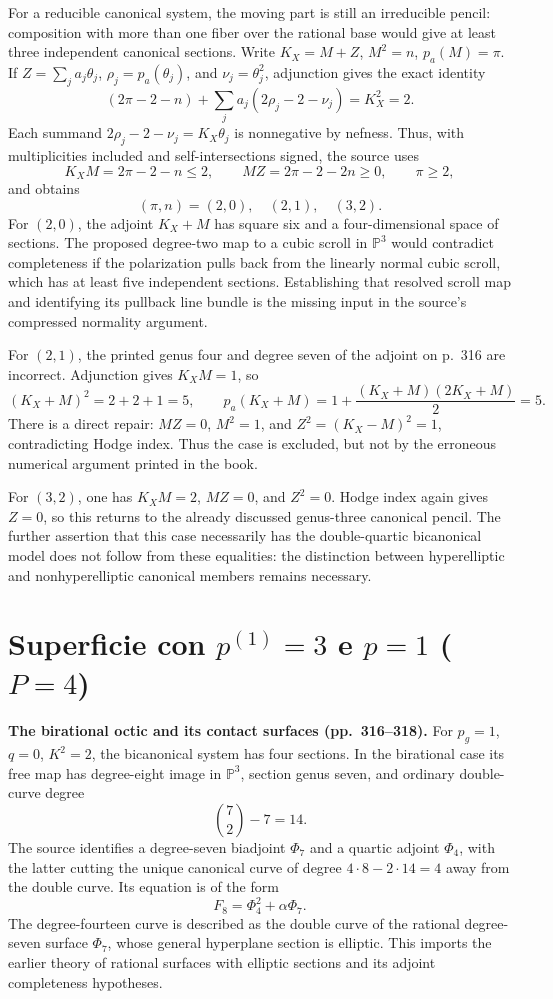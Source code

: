 For a reducible canonical system, the moving part is still an irreducible pencil: composition with more than one fiber over the rational base would give at least three independent canonical sections. Write \(K_X=M+Z\), \(M^2=n\), \(p_a(M)=\pi\). If \(Z=\sum_j a_j\theta_j\), \(\rho_j=p_a(\theta_j)\), and \(\nu_j=\theta_j^2\), adjunction gives the exact identity
\[
(2\pi-2-n)+\sum_j a_j(2\rho_j-2-\nu_j)=K_X^2=2.
\]
Each summand \(2\rho_j-2-\nu_j=K_X\theta_j\) is nonnegative by nefness. Thus, with multiplicities included and self-intersections signed, the source uses
\[
K_XM=2\pi-2-n\leq2,\qquad
MZ=2\pi-2-2n\geq0,\qquad \pi\geq2,
\]
and obtains
\[
(\pi,n)=(2,0),\quad(2,1),\quad(3,2).
\]
For \((2,0)\), the adjoint \(K_X+M\) has square six and a four-dimensional space of sections. The proposed degree-two map to a cubic scroll in \(\mathbb P^3\) would contradict completeness if the polarization pulls back from the linearly normal cubic scroll, which has at least five independent sections. Establishing that resolved scroll map and identifying its pullback line bundle is the missing input in the source's compressed normality argument.

For \((2,1)\), the printed genus four and degree seven of the adjoint on p.~316 are incorrect. Adjunction gives \(K_XM=1\), so
\[
(K_X+M)^2=2+2+1=5,\qquad
p_a(K_X+M)=1+\frac{(K_X+M)(2K_X+M)}2=5.
\]
There is a direct repair: \(MZ=0\), \(M^2=1\), and \(Z^2=(K_X-M)^2=1\), contradicting Hodge index. Thus the case is excluded, but not by the erroneous numerical argument printed in the book.

For \((3,2)\), one has \(K_XM=2\), \(MZ=0\), and \(Z^2=0\). Hodge index again gives \(Z=0\), so this returns to the already discussed genus-three canonical pencil. The further assertion that this case necessarily has the double-quartic bicanonical model does not follow from these equalities: the distinction between hyperelliptic and nonhyperelliptic canonical members remains necessary.

\section{Superficie con \texorpdfstring{$p^{(1)}=3$}{p(1)=3} e \texorpdfstring{$p=1$}{p=1} (\texorpdfstring{$P=4$}{P=4})}
\label{cp2-viii-19}

\textbf{The birational octic and its contact surfaces (pp.~316--318).}
For \(p_g=1\), \(q=0\), \(K^2=2\), the bicanonical system has four sections. In the birational case its free map has degree-eight image in \(\mathbb P^3\), section genus seven, and ordinary double-curve degree
\[
\binom{7}{2}-7=14.
\]
The source identifies a degree-seven biadjoint \(\Phi_7\) and a quartic adjoint \(\Phi_4\), with the latter cutting the unique canonical curve of degree \(4\cdot8-2\cdot14=4\) away from the double curve. Its equation is of the form
\[
F_8=\Phi_4^2+\alpha\Phi_7.
\]
The degree-fourteen curve is described as the double curve of the rational degree-seven surface \(\Phi_7\), whose general hyperplane section is elliptic. This imports the earlier theory of rational surfaces with elliptic sections and its adjoint completeness hypotheses.

